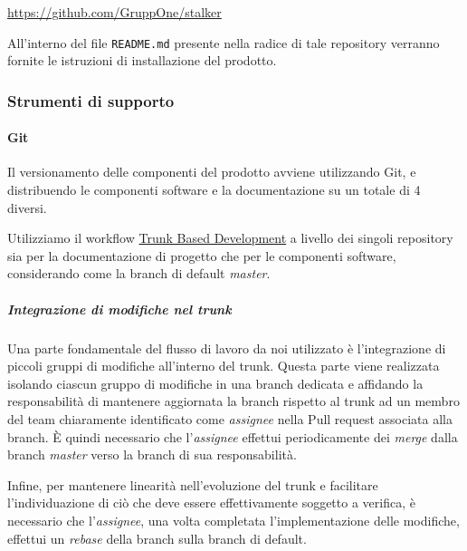 \documentclass[../../norme-di-progetto.tex]{subfiles}
\begin{document}
\begin{center}
  \href{https://github.com/GruppOne/stalker}{https://github.com/GruppOne/stalker}
\end{center}

All'interno del file \verb|README.md| presente nella radice di tale repository verranno fornite le istruzioni di installazione del prodotto.


\subsubsection{Strumenti di supporto}%
\label{subs:gestione_della_configurazione/strumenti_di_supporto}

\paragraph{Git}%
\label{par:git}

Il versionamento delle componenti del prodotto avviene utilizzando Git, e distribuendo le componenti software e la documentazione su un totale di 4  diversi.

Utilizziamo il workflow \href{https://trunkbaseddevelopment.com/}{Trunk Based Development} a livello dei singoli repository sia per la documentazione di progetto che per le componenti software, considerando come  la branch di default \textit{master}.

\subparagraph{Integrazione di modifiche nel trunk}%
\label{subp:integrazione_di_modifiche_nel_trunk}

Una parte fondamentale del flusso di lavoro da noi utilizzato è l'integrazione di piccoli gruppi di modifiche all'interno del trunk.
Questa parte viene realizzata isolando ciascun gruppo di modifiche in una branch dedicata e affidando la responsabilità di mantenere aggiornata la branch rispetto al trunk ad un membro del team chiaramente identificato come \textit{assignee} nella Pull request associata alla branch. È quindi necessario che l'\textit{assignee} effettui periodicamente dei \textit{merge} dalla branch \textit{master} verso la branch di sua responsabilità.

Infine, per mantenere linearità nell'evoluzione del trunk e facilitare l'individuazione di ciò che deve essere effettivamente soggetto a verifica, è necessario che l'\textit{assignee}, una volta completata l'implementazione delle modifiche, effettui un \textit{rebase} della branch sulla branch di default.
\end{document}
